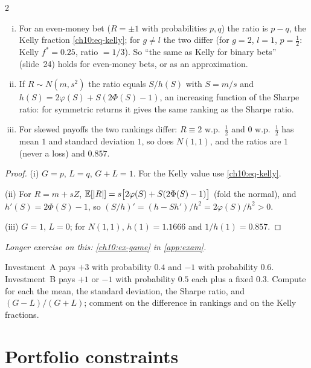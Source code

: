 \begin{paracol}{2}
\begin{proposition}\label{ch10:prop-gl}
\leavevmode
\begin{enumerate}[(i)]
  \item For an even-money bet ($R=\pm1$ with probabilities $p,q$) the ratio is $p-q$, the Kelly fraction \eqref{ch10:eq-kelly};
      for $g\neq l$ the two differ (for $g=2$, $l=1$, $p=\frac12$: Kelly $f^*=0.25$, ratio $=1/3$). So ``the same as Kelly
      for binary bets'' (slide~24) holds for even-money bets, or as an approximation.
  \item If $R\sim N(m,s^2)$ the ratio equals $S/h(S)$ with $S=m/s$ and $h(S)=2\varphi(S)+S(2\Phi(S)-1)$, an increasing function
      of the Sharpe ratio: for symmetric returns it gives the same ranking as the Sharpe ratio.
  \item For skewed payoffs the two rankings differ: $R\equiv2$ w.p.\ $\frac12$ and $0$ w.p.\ $\frac12$ has mean $1$ and standard deviation $1$,
      so does $N(1,1)$, and the ratios are $1$ (never a loss) and $0.857$.
\end{enumerate}
\end{proposition}
\begin{proof}
(i) $G=p$, $L=q$, $G+L=1$. For the Kelly value use \eqref{ch10:eq-kelly}.

(ii) For $R=m+sZ$,
$\mathbb{E}[|R|]=s\bigl[2\varphi(S)+S(2\Phi(S)-1)\bigr]$ (fold the normal), and $h'(S)=2\Phi(S)-1$, so
$(S/h)'=(h-Sh')/h^2=2\varphi(S)/h^2>0$.

(iii) $G=1$, $L=0$; for $N(1,1)$, $h(1)=1.1666$ and $1/h(1)=0.857$.
\end{proof}

\noindent\emph{Longer exercise on this: \cref{ch10:ex-game} in \cref{app:exam}.}

\begin{exercise}
Investment~A pays $+3$ with probability $0.4$ and $-1$ with probability $0.6$. Investment~B pays $+1$ or $-1$
with probability $0.5$ each plus a fixed $0.3$. Compute for each the mean, the standard deviation, the Sharpe ratio, and
$(G-L)/(G+L)$; comment on the difference in rankings and on the Kelly fractions.
\end{exercise}



\section{Portfolio constraints}\label{ch10:sec-constr}


\end{paracol}
